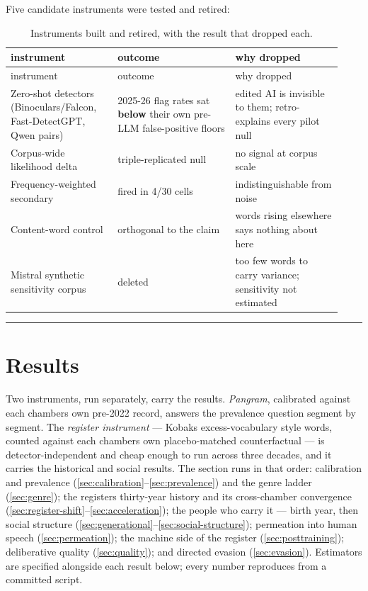 Five candidate instruments were tested and retired:

\begingroup\small
\begin{longtable}[]{@{}p{0.30\linewidth}p{0.33\linewidth}p{0.30\linewidth}@{}}
\caption{Instruments built and retired, with the result that dropped each.}\label{tab:retired}\\
\toprule\noalign{}
instrument & outcome & why dropped \\
\midrule\noalign{}
\endfirsthead
\toprule\noalign{}
instrument & outcome & why dropped \\
\midrule\noalign{}
\endhead
\bottomrule\noalign{}
\endlastfoot
Zero-shot detectors (Binoculars/Falcon, Fast-DetectGPT, Qwen pairs) & 2025-26 flag rates sat \textbf{below} their own pre-LLM false-positive floors & edited AI is invisible to them; retro-explains every pilot null \\
Corpus-wide likelihood delta & triple-replicated null & no signal at corpus scale \\
Frequency-weighted secondary & fired in 4/30 cells & indistinguishable from noise \\
Content-word control & orthogonal to the claim & words rising elsewhere says nothing about here \\
Mistral synthetic sensitivity corpus & deleted & too few words to carry variance; sensitivity not estimated \\
\end{longtable}
\endgroup

\begin{center}\rule{0.5\linewidth}{0.5pt}\end{center}

\section{Results}\label{sec:results}

Two instruments, run separately, carry the results. \emph{Pangram}, calibrated
against each chamber\textquotesingle s own pre-2022 record, answers the prevalence question
segment by segment. The \emph{register instrument} --- Kobak\textquotesingle s excess-vocabulary
style words, counted against each chamber\textquotesingle s own placebo-matched
counterfactual --- is detector-independent and cheap enough to run across three
decades, and it carries the historical and social results. The section runs in
that order: calibration and prevalence (\cref{sec:calibration}--\cref{sec:prevalence}) and the genre ladder
(\cref{sec:genre}); the register\textquotesingle s thirty-year history and its cross-chamber convergence
(\cref{sec:register-shift}--\cref{sec:acceleration}); the people who carry it --- birth year, then social structure
(\cref{sec:generational}--\cref{sec:social-structure}); permeation into human speech (\cref{sec:permeation}); the machine side of the
register (\cref{sec:posttraining}); deliberative quality (\cref{sec:quality}); and directed evasion (\cref{sec:evasion}).
Estimators are specified alongside each result below; every number reproduces
from a committed script.

